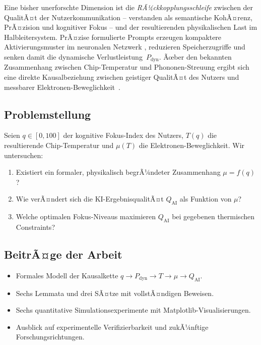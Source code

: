 ﻿\documentclass[a4paper,12pt]{article}
\theoremstyle{definition}
\begin{document}
Eine bisher unerforschte Dimension ist die \emph{RÃ¼ckkopplungsschleife} zwischen der
QualitÃ¤t der Nutzerkommunikation -- verstanden als semantische KohÃ¤renz, PrÃ¤zision und
kognitiver Fokus -- und der resultierenden physikalischen Last im Halbleitersystem.
PrÃ¤zise formulierte Prompts erzeugen kompaktere Aktivierungsmuster im neuronalen Netzwerk
\cite{Vaswani2017,Brown2020}, reduzieren Speicherzugriffe und senken damit die dynamische
Verlustleistung~$P_{\mathrm{dyn}}$. Ãœber den bekannten Zusammenhang zwischen Chip-Temperatur
und Phononen-Streuung ergibt sich eine direkte Kausalbeziehung zwischen geistiger QualitÃ¤t
des Nutzers und messbarer Elektronen-Beweglichkeit~\cite{Kittel2005}.

\subsection{Problemstellung}

Seien $q \in [0,100]$ der kognitive Fokus-Index des Nutzers, $T(q)$ die resultierende
Chip-Temperatur und $\mu(T)$ die Elektronen-Beweglichkeit. Wir untersuchen:

\begin{enumerate}
  \item Existiert ein formaler, physikalisch begrÃ¼ndeter Zusammenhang $\mu = f(q)$?
  \item Wie verÃ¤ndert sich die KI-ErgebnisqualitÃ¤t $Q_{\mathrm{AI}}$ als Funktion von $\mu$?
  \item Welche optimalen Fokus-Niveaus maximieren $Q_{\mathrm{AI}}$ bei gegebenen
        thermischen Constraints?
\end{enumerate}

\subsection{BeitrÃ¤ge der Arbeit}

\begin{itemize}
  \item Formales Modell der Kausalkette $q \to P_{\mathrm{dyn}} \to T \to \mu \to Q_{\mathrm{AI}}$.
  \item Sechs Lemmata und drei SÃ¤tze mit vollstÃ¤ndigen Beweisen.
  \item Sechs quantitative Simulationsexperimente mit Matplotlib-Visualisierungen.
  \item Ausblick auf experimentelle Verifizierbarkeit und zukÃ¼nftige Forschungsrichtungen.
\end{itemize}
\end{document}
